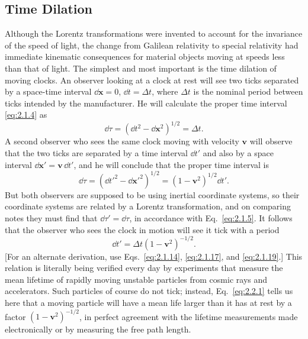 
\subsection{Time Dilation}\label{sec:2.2}

Although the Lorentz transformations were invented to account for the
invariance of the speed of light, the change from Galilean relativity to special
relativity had immediate kinematic consequences for material objects moving at
speeds less than that of light. The simplest and most important is the time
dilation of moving clocks. An observer looking at a clock at rest will see two
ticks separated by a space-time interval \(\dd\mathbf{x}=0\), \(\dd t=\Delta t\),
where \(\Delta t\) is the nominal period between ticks intended by the
manufacturer. He will calculate the proper time interval \eqref{eq:2.1.4} as
\[
  \dd\tau=(\dd t^2-\dd\mathbf{x}^2)^{1/2}=\Delta t .
\]
A second observer who sees the same clock moving with velocity \(\mathbf v\)
will observe that the two ticks are separated by a time interval \(\dd t'\) and
also by a space interval \(\dd\mathbf{x}'=\mathbf v\,\dd t'\), and he will conclude
that the proper time interval is
\[
  \dd\tau=(\dd t'^2-\dd\mathbf{x}'^2)^{1/2}
  =(1-\mathbf v^2)^{1/2}\dd t' .
\]
But both observers are supposed to be using inertial coordinate systems, so
their coordinate systems are related by a Lorentz transformation, and on
comparing notes they must find that \(\dd\tau'=\dd\tau\), in accordance with
Eq.~\eqref{eq:2.1.5}. It follows that the observer who sees the clock in motion
will see it tick with a period
\begin{equation}
  \dd t'=\Delta t(1-\mathbf v^2)^{-1/2}.
  \tag{2.2.1}\label{eq:2.2.1}
\end{equation}
[For an alternate derivation, use Eqs.~\eqref{eq:2.1.14},
\eqref{eq:2.1.17}, and \eqref{eq:2.1.19}.] This relation is literally being
verified every day by experiments that measure the mean lifetime of rapidly
moving unstable particles from cosmic rays and accelerators. Such particles of
course do not tick; instead, Eq.~\eqref{eq:2.2.1} tells us here that a moving
particle will have a mean life larger than it has at rest by a factor
\((1-\mathbf v^2)^{-1/2}\), in perfect agreement with the lifetime
measurements made electronically or by measuring the free path length.

